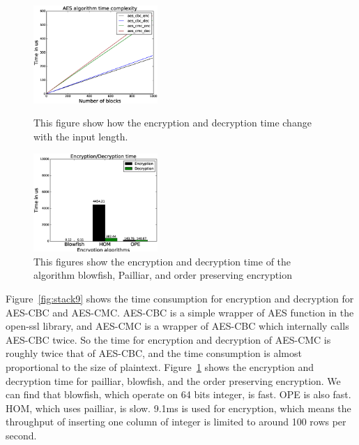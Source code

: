 \begin{figure}   
  \begin{minipage}[t]{0.5\linewidth}  
    \centering   
    \includegraphics[width=4.7cm]{images/aes.eps}   
    \caption{\small{This figure show how the encryption and decryption time change with the input length.}}   
    \label{fig:stack9}   
  \end{minipage}%
  \begin{minipage}[t]{0.5\linewidth}
    \centering   
    \includegraphics[width=4.7cm]{images/time.eps}   
    \caption{\small{This figures show the encryption and decryption time of the algorithm blowfish, Pailliar, and order preserving encryption}}  
    \label{fig:stack10}   
  \end{minipage}   
\end{figure}







Figure~\ref{fig:stack9} shows the time consumption for encryption and decryption for AES-CBC and AES-CMC. AES-CBC is a simple wrapper of AES function in the open-ssl library, and AES-CMC is a wrapper of AES-CBC  which internally calls AES-CBC twice. So the time for encryption and decryption of AES-CMC is roughly twice that of AES-CBC, and the time consumption is almost proportional to the size of plaintext. Figure~\ref{fig:stack10} shows the encryption and decryption time for pailliar, blowfish, and the order preserving encryption. We can find that blowfish, which operate on 64 bits integer, is fast. OPE is also fast. HOM, which uses pailliar, is slow. 9.1ms is used for encryption, which means the throughput of inserting one column of integer is limited to around 100 rows per second.

